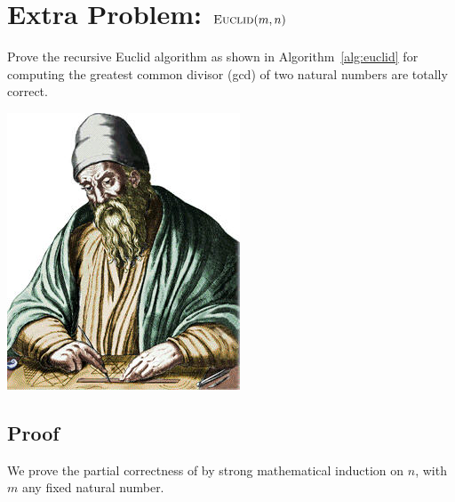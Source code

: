 
\section{Extra Problem: $\textsc{Euclid}(m, n)$}  \label{section:euclid}

Prove the recursive Euclid algorithm as shown in Algorithm~\ref{alg:euclid} for 
computing the greatest common divisor (gcd) of two natural numbers are totally correct.

\begin{marginfigure}%
  \includegraphics[width=0.60\linewidth]{figs/euclid}
  \label{fig:euclid}
\end{marginfigure}



\subsection{Proof}


We prove the partial correctness of \euclid{} by strong mathematical induction on $n$,
with $m$ any fixed natural number.

